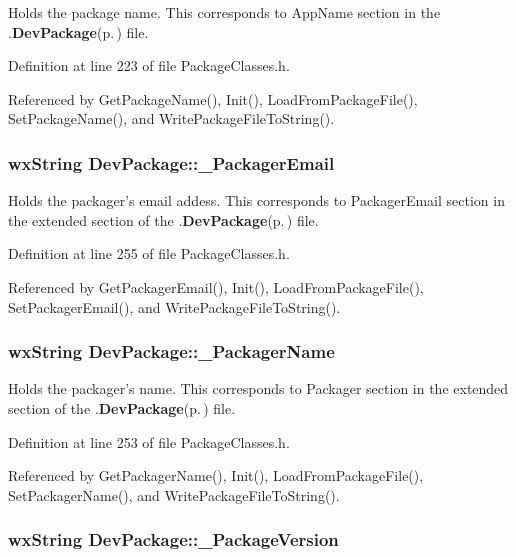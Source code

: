Holds the package name. This corresponds to App\-Name section in the .{\bf Dev\-Package}{\rm (p.\,\pageref{class_dev_package})} file. 

Definition at line 223 of file Package\-Classes.h.

Referenced by Get\-Package\-Name(), Init(), Load\-From\-Package\-File(), Set\-Package\-Name(), and Write\-Package\-File\-To\-String().
\subsubsection{\setlength{\rightskip}{0pt plus 5cm}wx\-String {\bf Dev\-Package::\_\-Packager\-Email}\hspace{0.3cm}{\tt  [private]}}\label{class_dev_package_c7255d04de32d2030a21235dcb08212a}


Holds the packager's email addess. This corresponds to Packager\-Email section in the extended section of the .{\bf Dev\-Package}{\rm (p.\,\pageref{class_dev_package})} file. 

Definition at line 255 of file Package\-Classes.h.

Referenced by Get\-Packager\-Email(), Init(), Load\-From\-Package\-File(), Set\-Packager\-Email(), and Write\-Package\-File\-To\-String().
\subsubsection{\setlength{\rightskip}{0pt plus 5cm}wx\-String {\bf Dev\-Package::\_\-Packager\-Name}\hspace{0.3cm}{\tt  [private]}}\label{class_dev_package_9d4a094d32f373e109585f945e964670}


Holds the packager's name. This corresponds to Packager section in the extended section of the .{\bf Dev\-Package}{\rm (p.\,\pageref{class_dev_package})} file. 

Definition at line 253 of file Package\-Classes.h.

Referenced by Get\-Packager\-Name(), Init(), Load\-From\-Package\-File(), Set\-Packager\-Name(), and Write\-Package\-File\-To\-String().
\subsubsection{\setlength{\rightskip}{0pt plus 5cm}wx\-String {\bf Dev\-Package::\_\-Package\-Version}\hspace{0.3cm}{\tt  [private]}}\label{class_dev_package_d7e4a610f436a65be31692b3cafe96a3}


